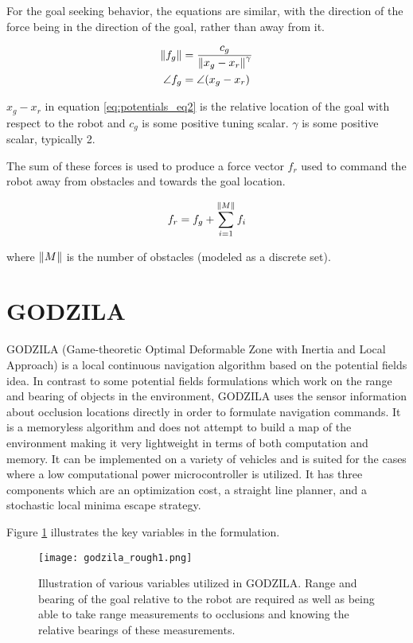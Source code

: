 For the goal seeking behavior, the equations are similar, with the direction of the force being in the direction of the 
goal, rather than away from it.

\begin{align}
	\left\lVert f_g\right\rVert  &= \frac{c_g}{\left\lVert x_g - x_r\right\rVert^\gamma}\\
	\angle{f_g} &= \angle(x_g - x_r)
\label{eq:potentials_eq2}
\end{align}

$x_g - x_r$ in equation \ref{eq:potentials_eq2} is the relative location of the goal with respect to the robot and $c_g$ is some positive
tuning scalar. $\gamma$ is some positive scalar, typically 2.

The sum of these forces is used to produce a force vector $f_r$ used to command the robot away from obstacles and towards the goal
location. 

\begin{equation}
	f_r = f_g + \sum_{i = 1}^{\left\lVert M\right\rVert} f_i
\label{eq:potentials_eq3}
\end{equation}

where $\left\lVert M\right\rVert$ is the number of obstacles (modeled as a discrete set).

\section{GODZILA} \label{sec:navgodzila}

GODZILA (Game-theoretic Optimal Deformable Zone with Inertia and Local Approach) \cite{Krishnamurthy07} is a local 
continuous navigation algorithm based on the potential fields idea. In contrast to some potential fields formulations
which work on the range and bearing of objects in the environment, GODZILA uses the sensor information about occlusion
locations directly in order to formulate navigation commands. It is a memoryless algorithm and does not attempt to
build a map of the environment making it very lightweight in terms of both computation and memory. It can be implemented
on a variety of vehicles and is suited for the cases where a low computational power microcontroller is utilized.
It has three components which are an optimization cost, a straight line planner, and a stochastic local minima escape strategy.

Figure \ref{fig:godzila_setup1} illustrates the key variables in the formulation.
\begin{figure}
	\centering
	\texttt{[image: godzila\_rough1.png]}
	\caption
	{Illustration of various variables utilized in GODZILA. Range and bearing of the goal relative to the robot are required
	 as well as being able to take range measurements to occlusions and knowing the relative bearings of these measurements.}
	\label{fig:godzila_setup1}
\end{figure}


